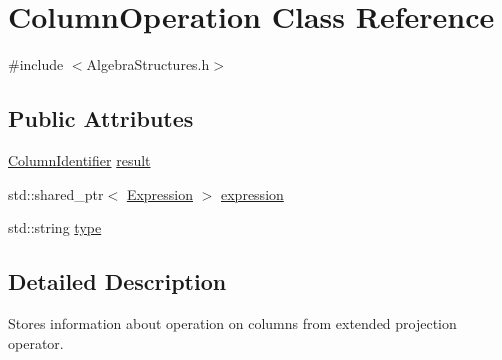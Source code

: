 \hypertarget{class_column_operation}{\section{Column\+Operation Class Reference}
\label{class_column_operation}
}


{\ttfamily \#include $<$Algebra\+Structures.\+h$>$}

\subsection*{Public Attributes}
\begin{DoxyCompactItemize}
\item 
\hyperlink{class_column_identifier}{Column\+Identifier} \hyperlink{class_column_operation_aab22c48d83db533c5b153136a4da6db7}{result}
\item 
std\+::shared\+\_\+ptr$<$ \hyperlink{class_expression}{Expression} $>$ \hyperlink{class_column_operation_a4d5d373009098230cb3a2bfa3aa3cc33}{expression}
\item 
std\+::string \hyperlink{class_column_operation_ae04fd07588173c74291e80032f80f991}{type}
\end{DoxyCompactItemize}


\subsection{Detailed Description}
Stores information about operation on columns from extended projection operator. 

